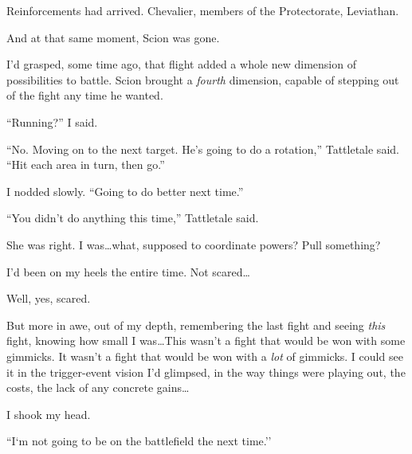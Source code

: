 Reinforcements had arrived.  Chevalier, members of the Protectorate, Leviathan.



And at that same moment, Scion was gone.



I'd grasped, some time ago, that flight added a whole new dimension of possibilities to battle.  Scion brought a \emph{fourth} dimension, capable of stepping out of the fight any time he wanted.



``Running?'' I said.



``No.  Moving on to the next target.  He's going to do a rotation,'' Tattletale said.  ``Hit each area in turn, then go.''



I nodded slowly.  ``Going to do better next time.''



``You didn't do anything this time,'' Tattletale said.



She was right.  I was\ldots what, supposed to coordinate powers?  Pull something?



I'd been on my heels the entire time.  Not scared\ldots



Well, yes, scared.



But more in awe, out of my depth, remembering the last fight and seeing \emph{this} fight, knowing how small I was\ldots  This wasn't a fight that would be won with some gimmicks.  It wasn't a fight that would be won with a \emph{lot} of gimmicks.  I could see it in the trigger-event vision I'd glimpsed, in the way things were playing out, the costs, the lack of any concrete gains\ldots



I shook my head.



``I`m not going to be on the battlefield the next time.''





